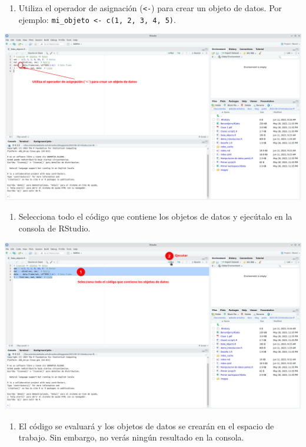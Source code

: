 \documentclass[
  a4paper,
]{article}
\providecommand{\tightlist}{%
  \setlength{\itemsep}{0pt}\setlength{\parskip}{0pt}}\usepackage{longtable,booktabs,array}
\begin{document}
\begin{enumerate}
\def\labelenumi{\arabic{enumi}.}
\tightlist
\item
  Utiliza el operador de asignación (\texttt{\textless{}-}) para crear
  un objeto de datos. Por ejemplo:
  \texttt{mi\_objeto\ \textless{}-\ c(1,\ 2,\ 3,\ 4,\ 5)}.
\end{enumerate}

\includegraphics{images/Screenshot_20230611_092644.png}

\begin{enumerate}
\def\labelenumi{\arabic{enumi}.}
\setcounter{enumi}{1}
\tightlist
\item
  Selecciona todo el código que contiene los objetos de datos y
  ejecútalo en la consola de RStudio.
\end{enumerate}

\includegraphics{images/Screenshot_20230611_093536.png}

\begin{enumerate}
\def\labelenumi{\arabic{enumi}.}
\setcounter{enumi}{2}
\tightlist
\item
  El código se evaluará y los objetos de datos se crearán en el espacio
  de trabajo. Sin embargo, no verás ningún resultado en la consola.
\end{enumerate}
\end{document}
